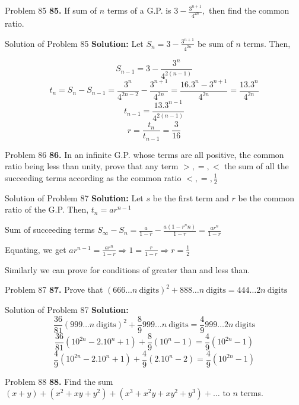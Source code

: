 \documentclass[aspectratio=1610,8pt]{beamer}
\begin{document}
\begin{frame}{Problem 85}
  \textbf{85.} If sum of $n$ terms of a G.P. is $3 - \frac{3^{n + 1}}{4^{2n}},$ then find the common ratio.
\end{frame}
\begin{frame}{Solution of Problem 85}
  \textbf{Solution:} Let $S_n =  3 - \frac{3^{n + 1}}{4^{2n}}$ be sum of $n$ terms. Then,

  $$S_{n - 1} = 3 - \frac{3^n}{4^{2(n - 1)}}$$
  $$t_n = S_n - S_{n - 1} = \frac{3^n}{4^{2{n - 2}}} - \frac{3^{n + 1}}{4^{2n}} = \frac{16.3^n - 3^{n + 1}}{4^{2n}} =
  \frac{13.3^{n}}{4^{2n}}$$
  $$t_{n - 1} = \frac{13.3^{n - 1}}{4^{2(n - 1)}}$$
  $$r = \frac{t_n}{t_{n - 1}} = \frac{3}{16}$$
\end{frame}
\begin{frame}{Problem 86}
  \textbf{86.} In an infinite G.P. whose terms are all positive, the common ratio being less than unity, prove that any term $>, =,
  <$ the sum of all the succeeding terms according as the common ratio $<, =, \frac{1}{2}$
\end{frame}
\begin{frame}{Solution of Problem 87}
  \textbf{Solution:} Let $s$ be the first term and $r$ be the common ratio of the G.P. Then, $t_n = ar^{n - 1}$

  Sum of succeeding terms $S_\infty - S_n = \frac{a}{1 - r} - \frac{a(1 - r^nn)}{1 - r} = \frac{ar^n}{1 - r}$

  Equating, we get $ar^{n - 1} = \frac{ar^n}{1 - r}\Rightarrow 1 = \frac{r}{1 - r}\Rightarrow r = \frac{1}{2}$

  Similarly we can prove for conditions of greater than and less than.
\end{frame}
\begin{frame}{Problem 87}
  \textbf{87.} Prove that $(666\ldots n~\text{digits})^2 + 888\ldots n~\text{digits} = 444\ldots 2n~\text{digits}$
\end{frame}
\begin{frame}{Solution of Problem 87}
  \textbf{Solution:} $$\frac{36}{81}(999\ldots n~\text{digits})^2 + \frac{8}{9}999\ldots n~\text{digits} = \frac{4}{9}999\ldots
  2n~\text{digits}$$
  $$\frac{36}{81}(10^{2n} - 2.10^n + 1) + \frac{8}{9}(10^n - 1) = \frac{4}{9}(10^{2n} - 1)$$
  $$\frac{4}{9}(10^{2n} - 2.10^n + 1) + \frac{4}{9}(2.10^n - 2)= \frac{4}{9}(10^{2n} - 1)$$
\end{frame}
\begin{frame}{Problem 88}
  \textbf{88.} Find the sum $(x + y) + (x^2 + xy + y^2) + (x^3 + x^2y + xy^2 + y^3) + \ldots$ to $n$ terms.
\end{frame}
\end{document}
